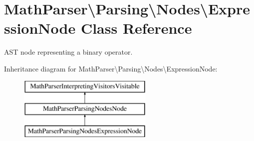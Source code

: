 \hypertarget{classMathParser_1_1Parsing_1_1Nodes_1_1ExpressionNode}{\section{Math\-Parser\textbackslash{}Parsing\textbackslash{}Nodes\textbackslash{}Expression\-Node Class Reference}
\label{classMathParser_1_1Parsing_1_1Nodes_1_1ExpressionNode}
}


A\-S\-T node representing a binary operator.  


Inheritance diagram for Math\-Parser\textbackslash{}Parsing\textbackslash{}Nodes\textbackslash{}Expression\-Node\-:\begin{figure}[H]
\begin{center}
\leavevmode
\includegraphics[height=3.000000cm]{classMathParser_1_1Parsing_1_1Nodes_1_1ExpressionNode}
\end{center}
\end{figure}
